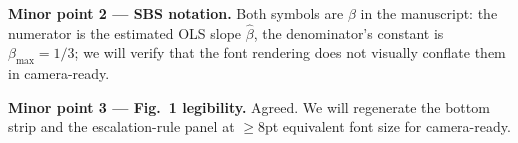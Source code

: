 \textbf{Minor point 2 --- SBS notation.} Both symbols are $\beta$ in the manuscript: the numerator is the estimated OLS slope $\hat{\beta}$, the denominator's constant is $\beta_{\max} = 1/3$; we will verify that the font rendering does not visually conflate them in camera-ready.

\textbf{Minor point 3 --- Fig.~1 legibility.} Agreed. We will regenerate the bottom strip and the escalation-rule panel at $\geq$8pt equivalent font size for camera-ready.
